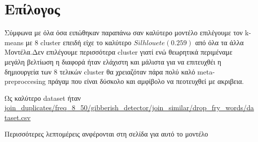 \section{ Επίλογος}
Σύμφωνα με όλα όσα ειπώθηκαν παραπάνω σαν καλύτερο μοντέλο
επιλέγουμε τον k-means με 8 cluster επειδή είχε το 
καλύτερο $Silhlouete(0.259)$ από όλα τα άλλα Μοντέλα.Δεν επιλέγουμε περισσότερα
cluster γιατί ενώ θεωρητικά περιμέναμε μεγάλη βελτίωση η διαφορά ήταν ελάχιστη
και μάλιστα για να επιτευχθέι η δημιουργεία των 8 τελικών cluster
θα χρειαζόταν πάρα πολύ καλό meta-preproccesing πράγαμ που είναι δύσκολο
και αμφίβολο να πεοτευχθεί με ακριβεια.

Ως καλύτερο dataset ήταν \url{join_duplicates/freq_8_50/gibberish_detector/join_similar/drop_fry_words/dataset.csv}

Περισσότερες λεπτομέρεις ανφέρονται στη σελίδα \pageref{kmeans8} για αυτό το μοντέλο 
 
